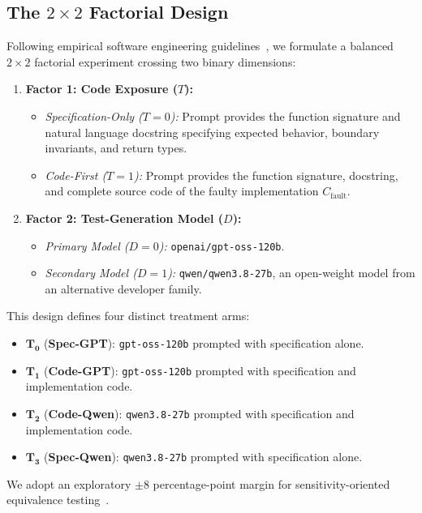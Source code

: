 \documentclass[11pt,a4paper]{article}
\begin{document}
\subsection{The \texorpdfstring{$2 \times 2$}{2x2} Factorial Design}
Following empirical software engineering guidelines~\cite{kitchenham2002preliminary,wohlin2012experimentation,runeson2009guidelines}, we formulate a balanced $2 \times 2$ factorial experiment crossing two binary dimensions:
\begin{enumerate}
    \item \textbf{Factor 1: Code Exposure ($T$):}
    \begin{itemize}
        \item \textit{Specification-Only ($T=0$):} Prompt provides the function signature and natural language docstring specifying expected behavior, boundary invariants, and return types.
        \item \textit{Code-First ($T=1$):} Prompt provides the function signature, docstring, and complete source code of the faulty implementation $C_{\text{fault}}$.
    \end{itemize}
    \item \textbf{Factor 2: Test-Generation Model ($D$):}
    \begin{itemize}
        \item \textit{Primary Model ($D=0$):} \texttt{openai/gpt-oss-120b}.
        \item \textit{Secondary Model ($D=1$):} \texttt{qwen/qwen3.8-27b}, an open-weight model from an alternative developer family.
    \end{itemize}
\end{enumerate}
This design defines four distinct treatment arms:
\begin{itemize}
    \item $\mathbf{T_0}$ (\textbf{Spec-GPT}): \texttt{gpt-oss-120b} prompted with specification alone.
    \item $\mathbf{T_1}$ (\textbf{Code-GPT}): \texttt{gpt-oss-120b} prompted with specification and implementation code.
    \item $\mathbf{T_2}$ (\textbf{Code-Qwen}): \texttt{qwen3.8-27b} prompted with specification and implementation code.
    \item $\mathbf{T_3}$ (\textbf{Spec-Qwen}): \texttt{qwen3.8-27b} prompted with specification alone.
\end{itemize}
We adopt an exploratory $\pm 8$ percentage-point margin for sensitivity-oriented equivalence testing~\cite{lakens2018equivalence}.
\end{document}
